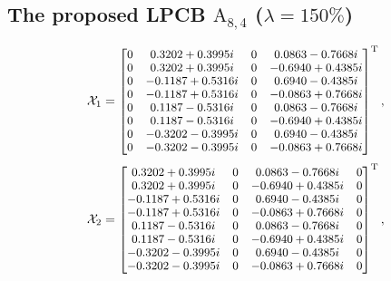 \documentclass[journal]{IEEEtran}
\begin{document}
  \subsection{The proposed LPCB $\text{A}_{8,4}$ ($\lambda = 150\%$)} 
    \vspace{-0.5em}
 \begin{equation}
  \footnotesize   
     \mathcal X_1=
\begin{bmatrix}
    0    &     0.3202 + 0.3995i    &     0    &     0.0863 - 0.7668i\\
   0    &     0.3202 + 0.3995i    &     0    &    -0.6940 + 0.4385i\\
   0    &    -0.1187 + 0.5316i    &     0    &     0.6940 - 0.4385i\\
   0    &    -0.1187 + 0.5316i    &     0    &    -0.0863 + 0.7668i\\
   0    &     0.1187 - 0.5316i    &     0    &     0.0863 - 0.7668i\\
   0    &     0.1187 - 0.5316i    &     0    &    -0.6940 + 0.4385i\\
   0    &    -0.3202 - 0.3995i    &     0    &     0.6940 - 0.4385i\\
   0    &    -0.3202 - 0.3995i    &     0    &    -0.0863 + 0.7668i
      \end{bmatrix}^{\text{T}}, \notag
  \end{equation}
\begin{equation}
  \footnotesize   
     \mathcal X_2=
\begin{bmatrix}
     0.3202 + 0.3995i    &     0    &     0.0863 - 0.7668i    &     0\\
   0.3202 + 0.3995i    &     0    &    -0.6940 + 0.4385i    &     0\\
  -0.1187 + 0.5316i    &     0    &     0.6940 - 0.4385i    &     0\\
  -0.1187 + 0.5316i    &     0    &    -0.0863 + 0.7668i    &     0\\
   0.1187 - 0.5316i    &     0    &     0.0863 - 0.7668i    &     0\\
   0.1187 - 0.5316i    &     0    &    -0.6940 + 0.4385i    &     0\\
  -0.3202 - 0.3995i    &     0    &     0.6940 - 0.4385i    &     0\\
  -0.3202 - 0.3995i    &     0    &    -0.0863 + 0.7668i    &     0\\
      \end{bmatrix}^{\text{T}}, \notag
  \end{equation}
\end{document}
